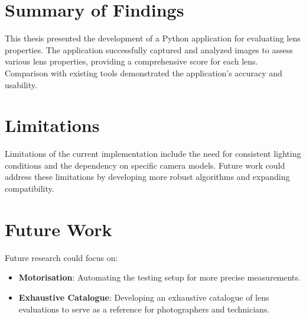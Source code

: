 
\section{Summary of Findings}
This thesis presented the development of a Python application for evaluating lens properties. The application successfully captured and analyzed images to assess various lens properties, providing a comprehensive score for each lens. Comparison with existing tools demonstrated the application's accuracy and usability.

\section{Limitations}
Limitations of the current implementation include the need for consistent lighting conditions and the dependency on specific camera models. Future work could address these limitations by developing more robust algorithms and expanding compatibility.

\section{Future Work}
Future research could focus on:
\begin{itemize}
    \item \textbf{Motorisation}: Automating the testing setup for more precise measurements.
    \item \textbf{Exhaustive Catalogue}: Developing an exhaustive catalogue of lens evaluations to serve as a reference for photographers and technicians.
\end{itemize}
